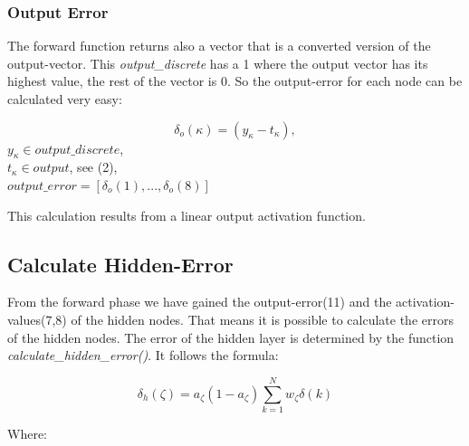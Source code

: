 \documentclass[10pt,a4paper]{article}
\begin{document}
  	\subsubsection{Output Error}
  	The forward function returns also a vector that is a converted version of the output-vector. This \textit{output\_discrete} has a 1 where the output vector has its highest value, the rest of the vector is 0. So the output-error for each node can be calculated very easy:
  	 \begin{center}
  		\begin{equation}
  		\delta_o(\kappa) = (y_{\kappa}-t_{\kappa}),
  		\end{equation}
  		$ y_{\kappa} \in \textit{output\_discrete} $, \\
  		$ t_{\kappa} \in \textit{output}$, see (2), \\
  		$ \textit{output\_error} = [\delta_o(1),...,\delta_o(8)] $
  	\end{center}
  	This calculation results from a linear output activation function.
  	\subsection{Calculate Hidden-Error}								%
	From the forward phase we have gained the output-error(11) and the activation-values(7,8) of the hidden nodes. That means it is possible to calculate the errors of the hidden nodes. The error of the hidden layer is determined by the function \textit{calculate\_hidden\_error()}. It follows the formula: \\
	 \begin{center}
		\begin{equation}
		\delta_h(\zeta) = a_{\zeta}(1-a_{\zeta}) \sum_{k=1}^{N} w_{\zeta}\delta(k)
		\end{equation} 
	\end{center}
	Where: \\
	
	
\end{document}
